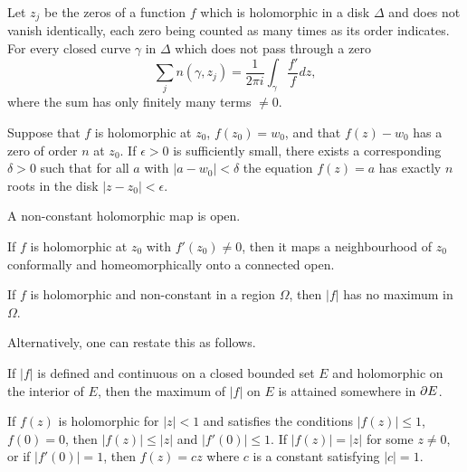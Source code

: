 \begin{proposition}
  Let $z_j$ be the zeros of a function $f$ which is holomorphic in a disk $\Delta$ and does not vanish identically, each zero being counted as many times as its order indicates. For every closed curve $\gamma$ in $\Delta$ which does not pass through a zero
  \[
  \sum_j n(\gamma,z_j) = \frac{1}{2 \pi i} \int_\gamma \frac{f'}{f} d z,
  \]
  where the sum has only finitely many terms $\neq 0$.
\end{proposition}

\begin{theorem}
  Suppose that $f$ is holomorphic at $z_0$, $f(z_0) = w_0$, and that $f(z) - w_0$ has a zero of order $n$ at $z_0$. If $\epsilon > 0$ is sufficiently small, there exists a corresponding $\delta > 0$ such that for all $a$ with $|a-w_0| < \delta$ the equation $f(z) = a$ has exactly $n$ roots in the disk $|z-z_0| < \epsilon$.
\end{theorem}

\begin{corollary}
  A non-constant holomorphic map is open.
\end{corollary}

\begin{corollary}
  If $f$ is holomorphic at $z_0$ with $f'(z_0) \neq 0$, then it maps a neighbourhood of $z_0$ conformally and homeomorphically onto a connected open.
\end{corollary}

\begin{theorem}
  If $f$ is holomorphic and non-constant in a region $\Omega$, then $|f|$ has no maximum in $\Omega$.
\end{theorem}

Alternatively, one can restate this as follows.

\begin{corollary}
  If $|f|$ is defined and continuous on a closed bounded set $E$ and holomorphic on the interior of $E$, then the maximum of $|f|$ on $E$ is attained somewhere in $\partial E$.
\end{corollary}

\begin{theorem}
  If $f(z)$ is holomorphic for $|z| < 1$ and satisfies the conditions $|f(z)| \leq 1$, $f(0) = 0$, then $|f(z)| \leq |z|$ and $|f'(0)| \leq 1$. If $|f(z)| = |z|$ for some $z \neq 0$, or if $|f'(0)| = 1$, then $f(z) = c z$ where $c$ is a constant satisfying $|c| = 1$.
\end{theorem}

